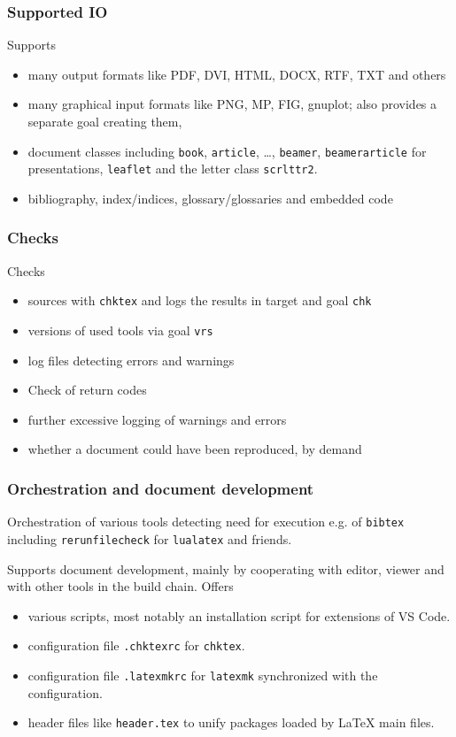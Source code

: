\begin{frame}
  \frametitle{Supported IO}
  Supports 
  \begin{itemize}
    \item
    many output formats like PDF, DVI, HTML, DOCX, RTF, TXT and others
    \item
    many graphical input formats like PNG, MP, FIG, gnuplot; 
    also provides a separate goal creating them,  
    \item
    document classes including \texttt{book}, \texttt{article}, \dots, 
    \texttt{beamer}, \texttt{beamerarticle} for presentations, 
    \texttt{leaflet} and the letter class \texttt{scrlttr2}. 
    \item
    bibliography, index/indices, glossary/glossaries and embedded code 
  \end{itemize}
\end{frame}


\begin{frame}
  \frametitle{Checks}
  Checks 
  \begin{itemize}
    \item
    sources with \texttt{chktex} and logs the results in target and goal \texttt{chk}%
    \item
    versions of used tools via goal \texttt{vrs}%
    \item
    log files detecting errors and warnings 
    \item
    Check of return codes 
    \item
    further excessive logging of warnings and errors 
    \item
    whether a document could have been reproduced, by demand 
  \end{itemize}
\end{frame}

\begin{frame}
  \frametitle{Orchestration and document development}
  Orchestration of various tools detecting need for execution e.g.
  of \texttt{bibtex} including \texttt{rerunfilecheck} for \texttt{lualatex} and friends.

  Supports document development, mainly by cooperating with editor, viewer and with other tools in the build chain. 
  Offers 
  \begin{itemize}
    \item various scripts, 
    most notably an installation script for extensions of VS Code.
    \item configuration file \texttt{.chktexrc} for \texttt{chktex}.
    \item configuration file \texttt{.latexmkrc} for \texttt{latexmk} 
    synchronized with the configuration.
    \item header files like \texttt{header.tex} 
    to unify packages loaded by \LaTeX{} main files. %
  \end{itemize}
\end{frame}


